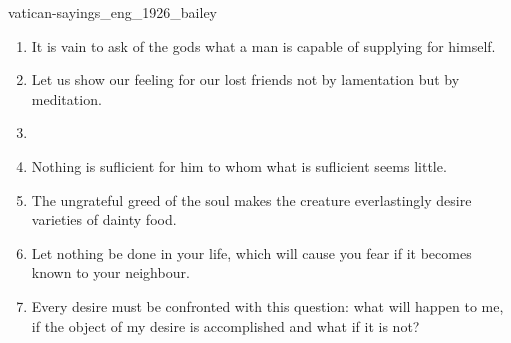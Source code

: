 \documentclass{stex}
\begin{document}
\begin{smodule}{vatican-sayings_eng_1926_bailey}
\begin{sparagraph}[id=vatican-sayings,name={Vatican Sayings}]
\begin{enumerate}[listparindent=0cm]
    \item\begin{sparagraph}[id=saying:65,name=Vatican Saying 65]
      It is vain to ask of the gods what a man is capable of supplying for himself.
    \end{sparagraph}

    \item\begin{sparagraph}[id=saying:66,name=Vatican Saying 66]
      Let us show our feeling for our lost friends not by lamentation but by meditation.
    \end{sparagraph}

    \item{}

    \item\begin{sparagraph}[id=saying:68,name=Vatican Saying 68]
      Nothing is suflicient for him to whom what is suflicient seems little.
    \end{sparagraph}

    \item\begin{sparagraph}[id=saying:69,name=Vatican Saying 69]
      The ungrateful greed of the soul makes the creature everlastingly desire varieties of dainty food.
    \end{sparagraph}

    \item\begin{sparagraph}[id=saying:70,name=Vatican Saying 70]
      Let nothing be done in your life, which will cause you fear if it becomes known to your neighbour.
    \end{sparagraph}

    \item\begin{sparagraph}[id=saying:71,name=Vatican Saying 71]
      Every desire must be confronted with this question: what will happen to me, if the object of my desire is accomplished and what if it is not?
    \end{sparagraph}


\end{enumerate}
\end{sparagraph}
\end{smodule}
\end{document}
